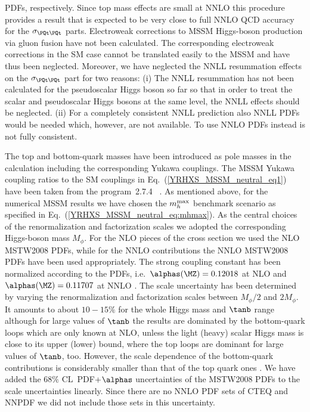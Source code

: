 PDFs, respectively.  Since top mass effects are small at NNLO
\cite{Marzani:2008az,Harlander:2009bw,Harlander:2009mq,Harlander:2009my,
Pak:2009bx,Pak:2009dg} this procedure provides a result that is
expected to be very close to full NNLO QCD accuracy for the
$\sigma_{\PQt\PQt}$ parts.  Electroweak corrections to MSSM Higgs-boson
production via gluon fusion have not been calculated. The corresponding
electroweak corrections in the SM case
\cite{Djouadi:1994ge,Aglietti:2004nj,Degrassi:2004mx,Actis:2008ug}
cannot be translated easily to the MSSM and have thus been neglected.
Moreover, we have neglected the NNLL resummation effects
\cite{Catani:2003zt,Ravindran:2005vv,Moch:2005ky} on the
$\sigma_{\PQt\PQt}$ part for two reasons: (i) The NNLL resummation has not
been calculated for the pseudoscalar Higgs boson so far so that in order
to treat the scalar and pseudoscalar Higgs bosons at the same level, the
NNLL effects should be neglected. (ii) For a completely consistent NNLL
prediction also NNLL PDFs would be needed which, however, are not
available. To use NNLO PDFs instead is not fully consistent.

The top and bottom-quark masses have been introduced as pole masses in
the calculation including the corresponding Yukawa couplings. The MSSM
Yukawa coupling ratios to the SM couplings in
Eq.~(\ref{YRHXS_MSSM_neutral_eq1}) have been taken from the program
\FeynHiggs\,2.7.4~\cite{Heinemeyer:1998yj,Heinemeyer:1998np,Degrassi:2002fi,
Frank:2006yh} . As mentioned above, for the numerical MSSM results we
have chosen the $m_h^{\rm max}$ benchmark scenario as specified in
Eq.~(\ref{YRHXS_MSSM_neutral_eq:mhmax}).  As the central choices of the
renormalization and factorization scales we adopted the corresponding
Higgs-boson mass $M_\phi$. For the NLO pieces of the cross section we
used the NLO MSTW2008 PDFs, while for the NNLO contributions the NNLO
MSTW2008 PDFs have been used appropriately. The strong coupling constant
has been normalized according to the PDFs, i.e.~$\alphas(\MZ)=0.12018$
at NLO and $\alphas(\MZ)=0.11707$ at NNLO
\cite{Martin:2009iq,Martin:2009bu}. The scale uncertainty has been
determined by varying the renormalization and factorization scales
between $M_\phi/2$ and $2M_\phi$. It amounts to about $10{-}15\%$ for the whole
Higgs mass and $\tanb$ range although for large values of $\tanb$ the
results are dominated by the bottom-quark loops which are only known at
NLO, unless the light (heavy) scalar Higgs mass is close to its upper
(lower) bound, where the top loops are dominant for large values of
$\tanb$, too. However, the scale dependence of the bottom-quark
contributions is considerably smaller than that of the top quark ones
\cite{Spira:1993bb,Spira:1995rr}.  We have added the $68\%$
CL~PDF+$\alphas$ uncertainties of the MSTW2008 PDFs to the scale
uncertainties linearly. Since there are no NNLO PDF sets of CTEQ and
NNPDF we did not include those sets in this uncertainty.

